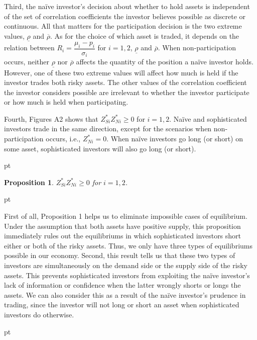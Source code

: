 \documentclass[10pt]{article}
\newtheorem{prop}{Proposition}
\begin{document}
Third, the na\"ive investor's decision about whether to hold assets is independent of the set of correlation coefficients the investor believes possible as discrete or continuous. All that matters for the participation decision is the two extreme values, $ \underline{\rho} $ and $ \overline{\rho} $. As for the choice of which asset is traded, it depends on the relation between $ R_i = \dfrac{\mu_i - p_i}{\sigma_i} $ for $ i = 1, 2 $, $ \underline{\rho} $ and $ \overline{\rho} $. When non-participation occurs, neither $ \underline{\rho} $ nor $ \overline{\rho} $ affects the quantity of the position a na\"ive investor holds. However, one of these two extreme values will affect how much is held if the investor trades both risky assets. The other values of the correlation coefficient the investor considers possible are irrelevant to whether the investor participate or how much is held when participating.

Fourth, Figures A2 shows that $ Z_{S i}^* Z_{N i}^* \geqslant 0 $ for $ i = 1, 2 $. Na\"ive and sophisticated investors trade in the same direction, except for the scenarios when non-participation occurs, i.e., $ Z_{N i}^* = 0 $. When na\"ive investors go long (or short) on some asset, sophisticated investors will also go long (or short). 

 pt

\begin{prop}
$ Z_{S i}^* Z_{N i}^* \geqslant 0 $ for $ i = 1, 2 $.
\end{prop}

 pt

First of all, Proposition 1 helps us to eliminate impossible cases of equilibrium. Under the assumption that both assets have positive supply, this proposition immediately rules out the equilibriums in which sophisticated investors short either or both of the risky assets. Thus, we only have three types of equilibriums possible in our economy. Second, this result tells us that these two types of investors are simultaneously on the demand side or the supply side of the risky assets. This prevents sophisticated investors from exploiting the na\"ive investor's lack of information or confidence when the latter wrongly shorts or longs the assets. We can also consider this as a result of the na\"ive investor's prudence in trading, since the investor will not long or short an asset when sophisticated investors do otherwise.

 pt
\end{document}

